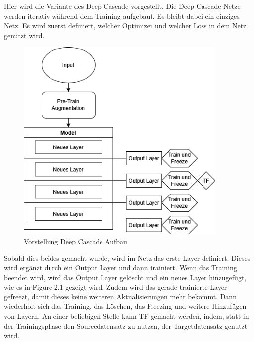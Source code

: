 Hier wird die Variante des Deep Cascade vorgestellt. 
Die Deep Cascade Netze werden iterativ während dem Training aufgebaut. Es bleibt dabei ein einziges Netz. Es wird zuerst 
definiert, welcher Optimizer und welcher Loss in dem Netz genutzt wird. 

\begin{figure}[htpb]
    \includegraphics[height=10cm]{../../Graphiken/deepcascade_2.png}
    \caption{\label{fig:deepcascade} Vorstellung Deep Cascade Aufbau}
\end{figure}

Sobald dies beides gemacht wurde, wird im Netz das erste Layer definiert. Dieses wird ergänzt durch ein Output Layer und dann trainiert. 
Wenn das Training beendet wird, wird das Output Layer gelöscht und ein neues Layer hinzugefügt, wie es in Figure 2.1 gezeigt wird. Zudem wird 
das gerade trainierte Layer gefreezt, damit dieses keine weiteren Aktualisierungen mehr bekommt. 
Dann wiederholt sich das Training, das Löschen, das Freezing und weitere Hinzufügen von Layern. 
An einer beliebigen Stelle kann TF gemacht werden, indem, statt in der Trainingsphase den Sourcedatensatz zu nutzen, der Targetdatensatz 
genutzt wird. 

